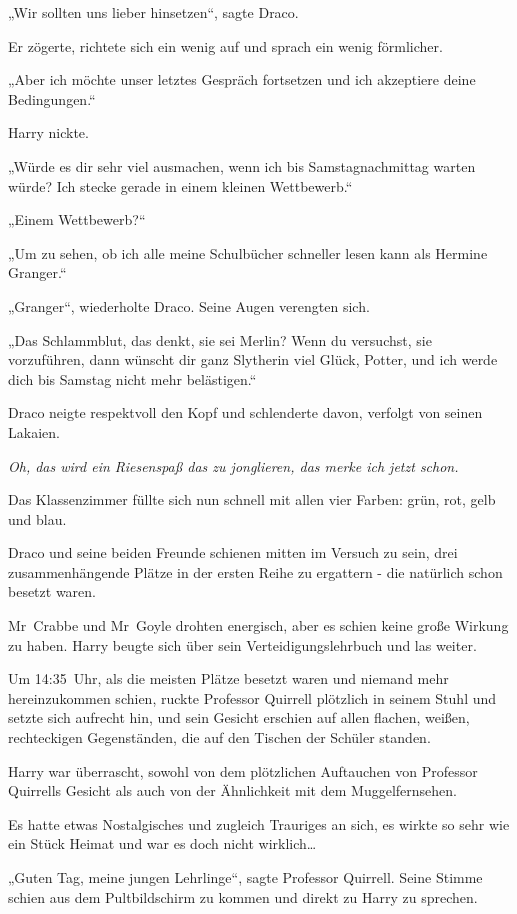{„Wir sollten uns lieber hinsetzen“, sagte Draco.

Er zögerte, richtete sich ein wenig auf und sprach ein wenig förmlicher.

„Aber ich möchte unser letztes Gespräch fortsetzen und ich akzeptiere deine Bedingungen.“

Harry nickte.

„Würde es dir sehr viel ausmachen, wenn ich bis Samstagnachmittag warten würde? Ich stecke gerade in einem kleinen Wettbewerb.“

„Einem Wettbewerb?“

„Um zu sehen, ob ich alle meine Schulbücher schneller lesen kann als Hermine Granger.“

„Granger“, wiederholte Draco. Seine Augen verengten sich.

„Das Schlammblut, das denkt, sie sei Merlin? Wenn du versuchst, sie vorzuführen, dann wünscht dir ganz Slytherin viel Glück, Potter, und ich werde dich bis Samstag nicht mehr belästigen.“

Draco neigte respektvoll den Kopf und schlenderte davon, verfolgt von seinen Lakaien.

\emph{Oh, das wird ein Riesenspaß das zu jonglieren, das merke ich jetzt schon.}

Das Klassenzimmer füllte sich nun schnell mit allen vier Farben: grün, rot, gelb und blau.

Draco und seine beiden Freunde schienen mitten im Versuch zu sein, drei zusammenhängende Plätze in der ersten Reihe zu ergattern - die natürlich schon besetzt waren.

Mr~Crabbe und Mr~Goyle drohten energisch, aber es schien keine große Wirkung zu haben. Harry beugte sich über sein Verteidigungslehrbuch und las weiter.

Um 14:35~Uhr, als die meisten Plätze besetzt waren und niemand mehr hereinzukommen schien, ruckte Professor Quirrell plötzlich in seinem Stuhl und setzte sich aufrecht hin, und sein Gesicht erschien auf allen flachen, weißen, rechteckigen Gegenständen, die auf den Tischen der Schüler standen.

Harry war überrascht, sowohl von dem plötzlichen Auftauchen von Professor Quirrells Gesicht als auch von der Ähnlichkeit mit dem Muggelfernsehen.

Es hatte etwas Nostalgisches und zugleich Trauriges an sich, es wirkte so sehr wie ein Stück Heimat und war es doch nicht wirklich…

„Guten Tag, meine jungen Lehrlinge“, sagte Professor Quirrell. Seine Stimme schien aus dem Pultbildschirm zu kommen und direkt zu Harry zu sprechen.

}
